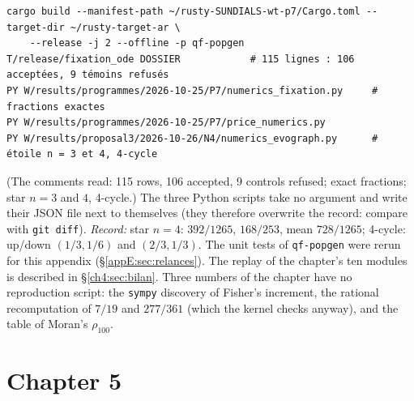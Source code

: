 \begin{lstlisting}[style=appC,language={}]
cargo build --manifest-path ~/rusty-SUNDIALS-wt-p7/Cargo.toml --target-dir ~/rusty-target-ar \
    --release -j 2 --offline -p qf-popgen
T/release/fixation_ode DOSSIER            # 115 lignes : 106 acceptées, 9 témoins refusés
PY W/results/programmes/2026-10-25/P7/numerics_fixation.py     # fractions exactes
PY W/results/programmes/2026-10-25/P7/price_numerics.py
PY W/results/proposal3/2026-10-26/N4/numerics_evograph.py      # étoile n = 3 et 4, 4-cycle
\end{lstlisting}
(The comments read: 115 rows, 106 accepted, 9 controls refused; exact fractions; star $n=3$ and $4$, 4-cycle.) The
three Python scripts take no argument and write their JSON file next to themselves (they therefore overwrite the
record: compare with \texttt{git diff}). \emph{Record:} star $n=4$: $392/1265$, $168/253$, mean $728/1265$; 4-cycle:
up/down $(1/3,1/6)$ and $(2/3,1/3)$. The unit tests of \texttt{qf-popgen} were rerun for this appendix
(§\ref{appE:sec:relances}). The \lean{leanchecker} replay of the chapter's ten modules is described in
§\ref{ch4:sec:bilan}. Three numbers of the chapter have no reproduction script: the \texttt{sympy} discovery of Fisher's
increment, the rational recomputation of $7/19$ and $277/361$ (which the kernel checks anyway), and the table of Moran's
$\rho_{100}$.

\section{Chapter 5}\label{appE:sec:ch5}

